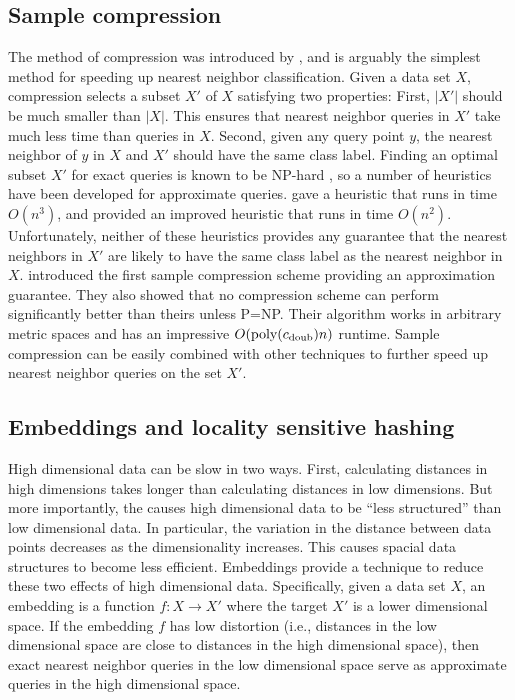 \documentclass[thesis.tex]{subfiles}
\newcommand{\cdoub}{c_\textnormal{doub}}
\newcommand{\poly}[1]{\text{poly}(#1)}
\begin{document}

\subsection{Sample compression}

The method of compression was introduced by \citet{hart1968condensed},
and is arguably the simplest method for speeding up nearest neighbor classification.
Given a data set $X$, compression selects a subset $X'$ of $X$ satisfying two properties:
First, $|X'|$ should be much smaller than $|X|$.
This ensures that nearest neighbor queries in $X'$ take much less time than queries in $X$.
Second, given any query point $y$, 
the nearest neighbor of $y$ in $X$ and $X'$ should have the same class label. 
Finding an optimal subset $X'$ for exact queries is known to be NP-hard \citep{zukhba2010np},
so a number of heuristics have been developed for approximate queries.
\citet{hart1968condensed} gave a heuristic that runs in time $O(n^3)$,
and \cite{angiulli2005fast} provided an improved heuristic that runs in time $O(n^2)$.
Unfortunately, neither of these heuristics provides any guarantee that the nearest neighbors in $X'$ are likely to have the same class label as the nearest neighbor in $X$.
\cite{gottlieb2014near} introduced the first sample compression scheme providing an approximation guarantee.
They also showed that no compression scheme can perform significantly better than theirs unless P=NP.
Their algorithm works in arbitrary metric spaces
and has an impressive $O(\poly{\cdoub}n)$ runtime.
Sample compression can be easily combined with other techniques to further speed up nearest neighbor queries on the set $X'$.


\subsection{Embeddings and locality sensitive hashing}

High dimensional data can be slow in two ways.
First, calculating distances in high dimensions takes longer than calculating distances in low dimensions.
But more importantly, the  causes high dimensional data to be ``less structured'' than low dimensional data.
In particular, the variation in the distance between data points decreases as the dimensionality increases.
This causes spacial data structures to become less efficient.
Embeddings provide a technique to reduce these two effects of high dimensional data.
Specifically, given a data set $X$, an embedding is a function $f : X \to X'$ where the target $X'$ is a lower dimensional space.
If the embedding $f$ has low distortion 
(i.e., distances in the low dimensional space are close to distances in the high dimensional space),
then exact nearest neighbor queries in the low dimensional space serve as approximate queries in the high dimensional space.
\end{document}
